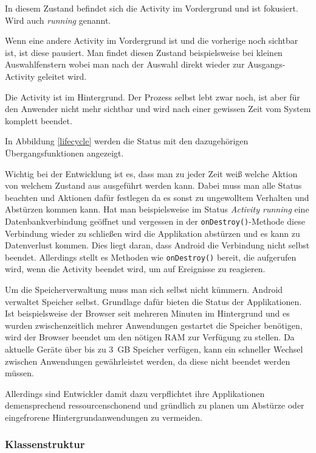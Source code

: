 \begin{description}[style=nextline]
	\item[Resumed] In diesem Zustand befindet sich die Activity im Vordergrund und ist fokusiert. Wird auch \emph{running} genannt.
	\item[Paused] Wenn eine andere Activity im Vordergrund ist und die vorherige noch sichtbar ist, ist diese pausiert. Man findet diesen Zustand beispielsweise bei kleinen Auswahlfenstern wobei man nach der Auswahl direkt wieder zur Ausgangs-Activity geleitet wird.
	\item[Stopped] Die Activity ist im Hintergrund. Der Prozess selbst lebt zwar noch, ist aber für den Anwender nicht mehr sichtbar und wird nach einer gewissen Zeit vom System komplett beendet. 
\end{description}

In Abbildung \ref{lifecycle} werden die Status mit den dazugehörigen Übergangsfunktionen angezeigt.

Wichtig bei der Entwicklung ist es, dass man zu jeder Zeit weiß welche Aktion von welchem Zustand aus ausgeführt werden kann. Dabei muss man alle Status beachten und Aktionen dafür festlegen da es sonst zu ungewolltem Verhalten und Abstürzen kommen kann. Hat man beispielsweise im Status \emph{Activity running} eine Datenbankverbindung geöffnet und vergessen in der \verb+onDestroy()+-Methode diese Verbindung wieder zu schließen wird die Applikation abstürzen und es kann zu Datenverlust kommen. Dies liegt daran, dass Android die Verbindung nicht selbst beendet. Allerdings stellt es Methoden wie \verb+onDestroy()+ bereit, die aufgerufen wird, wenn die Activity beendet wird, um auf Ereignisse zu reagieren.

Um die Speicherverwaltung muss man sich selbst nicht kümmern. Android verwaltet Speicher selbst. Grundlage dafür bieten die Status der Applikationen. Ist beispielsweise der Browser seit mehreren Minuten im Hintergrund und es wurden zwischenzeitlich mehrer Anwendungen gestartet die Speicher benötigen, wird der Browser beendet um den nötigen RAM zur Verfügung zu stellen. Da aktuelle Geräte über bis zu \SI{3}{GB} Speicher verfügen, kann ein schneller Wechsel zwischen Anwendungen gewährleistet werden, da diese nicht beendet werden müssen.

Allerdings sind Entwickler damit dazu verpflichtet ihre Applikationen demensprechend ressourcenschonend und gründlich zu planen um Abstürze oder eingefrorene Hintergrundanwendungen zu vermeiden.

\subsubsection{Klassenstruktur}

